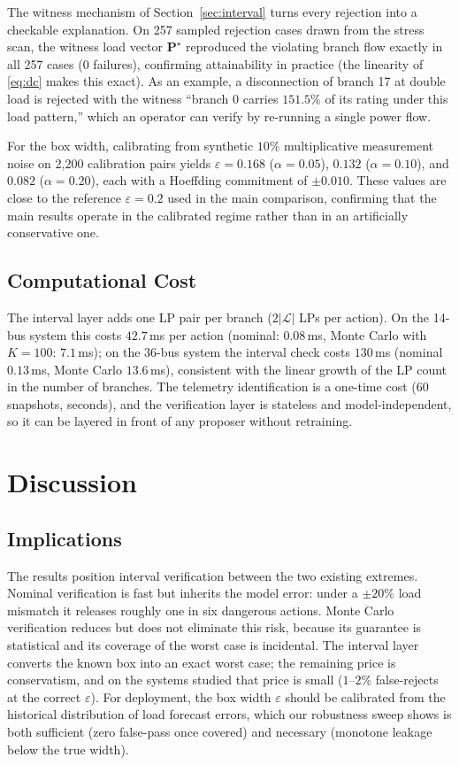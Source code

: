 \documentclass[11pt,a4paper]{article}
\begin{document}
The witness mechanism of Section~\ref{sec:interval} turns every rejection into
a checkable explanation. On 257 sampled rejection cases drawn from the stress
scan, the witness load vector $\mathbf{P}^\star$ reproduced the violating
branch flow exactly in all 257 cases (0 failures), confirming attainability in
practice (the linearity of \eqref{eq:dc} makes this exact). As an example, a
disconnection of branch 17 at double load is rejected with the witness
``branch 0 carries $151.5\%$ of its rating under this load pattern,'' which an
operator can verify by re-running a single power flow.

For the box width, calibrating from synthetic $10\%$ multiplicative
measurement noise on 2{,}200 calibration pairs yields
$\varepsilon = 0.168$ ($\alpha = 0.05$), $0.132$ ($\alpha = 0.10$), and
$0.082$ ($\alpha = 0.20$), each with a Hoeffding commitment of $\pm 0.010$.
These values are close to the reference $\varepsilon = 0.2$ used in the main
comparison, confirming that the main results operate in the calibrated regime
rather than in an artificially conservative one.

\subsection{Computational Cost}
\label{sec:rescost}

The interval layer adds one LP pair per branch ($2|\mathcal{L}|$ LPs per action).
On the 14-bus system this costs $42.7$\,ms per action (nominal: $0.08$\,ms,
Monte Carlo with $K=100$: $7.1$\,ms); on the 36-bus system the interval check
costs $130$\,ms (nominal $0.13$\,ms, Monte Carlo $13.6$\,ms), consistent with
the linear growth of the LP count in the number of branches. The telemetry
identification is a one-time cost (60 snapshots, seconds), and the
verification layer is stateless and model-independent, so it can be layered in
front of any proposer without retraining.

\section{Discussion}
\label{sec:discussion}

\subsection{Implications}

The results position interval verification between the two existing extremes.
Nominal verification is fast but inherits the model error: under a $\pm 20\%$
load mismatch it releases roughly one in six dangerous actions. Monte Carlo
verification reduces but does not eliminate this risk, because its guarantee is
statistical and its coverage of the worst case is incidental. The interval layer
converts the known box into an exact worst case; the remaining price is
conservatism, and on the systems studied that price is small ($1$--$2\%$
false-rejects at the correct $\varepsilon$). For deployment, the box width
$\varepsilon$ should be calibrated from the historical distribution of load
forecast errors, which our robustness sweep shows is both sufficient (zero
false-pass once covered) and necessary (monotone leakage below the true width).
\end{document}
